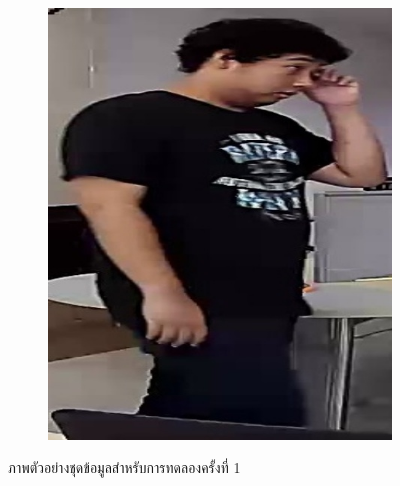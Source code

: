 \begin{figure}[!ht]
\begin{subfigure}[b]{0.2\textwidth}
        \includegraphics[width=\textwidth]{chapter4/images/o_1.jpg}
        \label{fig:ex_2}
    \end{subfigure}
    \caption{ภาพตัวอย่างชุดข้อมูลสำหรับการทดลองครั้งที่ 1}
    \label{fig: ภาพตัวอย่างชุดข้อมูลสำหรับการทดลอง 1}
\end{figure}

